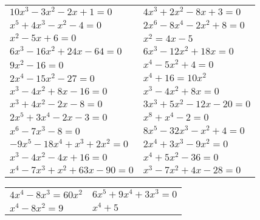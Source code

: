 \documentclass[12pt,a4paper]{article}
\begin{document}
\begin{enumerate}[1.]
\begin{enumerate}[1)]
\begin{tabular}{p{7cm} p{7cm}}
				\item $10x^3-3x^2-2x+1=0$		& \item $4x^3+2x^2-8x+3=0$ \\
				\item $x^5+4x^3-x^2-4=0$		& \item $2x^6-8x^4-2x^2+8=0$ \\
				\item $x^2-5x+6=0$ 				& \item $x^2=4x-5$\\
				\item $6x^3-16x^2+24x-64=0$ 		& \item $6x^3-12x^2+18x=0$\\
				\item $9x^2-16=0$				& \item $x^4-5x^2+4=0$\\
				\item $2x^4-15x^2-27=0 $ 		& \item $x^4+16=10x^2$\\
				\item $x^3-4x^2+8x-16=0 $ 		& \item $x^3-4x^2+8x=0$\\
				\item $x^3+4x^2-2x-8=0 $ 		& \item $3x^3+5x^2-12x-20=0$\\
				\item $2x^5+3x^4-2x-3=0 $ 		& \item $x^8+x^4-2=0$\\
				\item $x^6-7x^3-8=0 $ 			& \item $8x^5-32x^3-x^2+4=0$\\
				\item $-9x^5-18x^4+x^3+2x^2=0 $ & \item $2x^4+3x^3-9x^2=0$\\
				\item $x^3-4x^2-4x+16=0$ 		& \item $x^4+5x^2-36=0$\\
				\item $x^4-7x^3+x^2+63x-90=0$ 	& \item $x^3 - 7x^2 + 4x - 28 = 0$\\ \end{tabular} \end{enumerate}
			
			
				\begin{enumerate}[1)] \begin{tabular}{p{7cm} p{7cm}} 
				\item $4x^4-8x^3=60x^2$ 	& \vspace{0.4cm}\item $6x^5+9x^4+3x^3=0 $\\
				\item $x^4-8x^2=9 $ 	& \item $x^4+5$\\
				\end{tabular} \end{enumerate}
	\end{enumerate}
\end{document}
